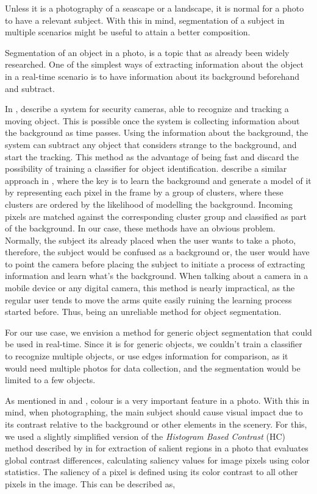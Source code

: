 Unless it is a photography of a seascape or a landscape, it is normal for a photo to have a relevant subject. With this in mind, segmentation of a subject in multiple scenarios might be useful to attain a better composition.

Segmentation of an object in a photo, is a topic that as already been widely researched. One of the simplest ways of extracting information about the object in a real-time scenario is to have information about its background beforehand and subtract. 

In \cite{yang2004real}, \citeauthor{yang2004real} describe a system for security cameras, able to recognize and tracking a moving object. This is possible once the system is collecting information about the background as time passes. Using the information about the background, the system can subtract any object that considers strange to the background, and start the tracking. This method as the advantage of being fast and discard the possibility of training a classifier for object identification. 
\citeauthor{butler2003real} describe a similar approach in \cite{butler2003real}, where the key is to learn the background and generate a model of it by representing each pixel in the frame by a group of clusters, where these clusters are ordered by the likelihood of modelling the background. Incoming pixels are matched against the corresponding cluster group and classified as part of the background.
In our case, these methods have an obvious problem. Normally, the subject its already placed when the user wants to take a photo, therefore, the subject would be confused as a background or, the user would have to point the camera before placing the subject to initiate a process of extracting information and learn what's the background. When talking about a  camera in a mobile device or any digital camera, this method is nearly impractical, as the regular user tends to move the arms quite easily ruining the learning process started before. Thus, being an unreliable method for object segmentation.

For our use case, we envision a method for generic object segmentation that could be used in real-time. Since it is for generic objects, we couldn't train a classifier to recognize multiple objects, or use edges information for comparison, as it would need multiple photos for data collection, and the segmentation would be limited to a few objects. 

As mentioned in \cite{Santos} and \cite{kamps2012rules}, colour is a very important feature in a photo. With this in mind, when photographing, the main subject should cause visual impact due to its contrast relative to the background or other elements in the scenery. For this, we used a slightly simplified version of the \emph{Histogram Based Contrast} (HC) method described by \citeauthor{cheng2011global} in \cite{cheng2011global} for extraction of salient regions in a photo that evaluates global contrast differences, calculating saliency values for image pixels using color statistics. The saliency of a pixel is defined using its color contrast to all other pixels in the image. This can be described as,

